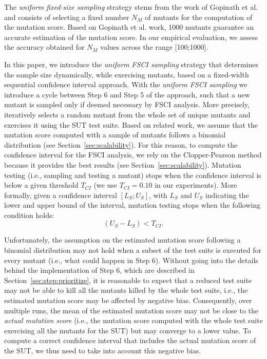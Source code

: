  {The \emph{uniform fixed-size sampling} strategy stems from the work of Gopinath et al.~\cite{gopinath2015hard} and consists of selecting a fixed number $N_M$ of mutants for the computation of the mutation score. Based on Gopinath et al. work, 1000 mutants guarantee an accurate estimation of the mutation score. In our empirical evaluation, we assess the accuracy obtained for $N_M$ values across the range [100;1000].}

 {In this paper, we introduce the \emph{uniform FSCI sampling} strategy that determines the sample size dynamically, while exercising mutants, based on a fixed-width sequential confidence interval approach.
With the \emph{uniform FSCI sampling} we introduce a cycle between Step 6 and Step 5 of the approach, such that a new mutant is sampled only if deemed necessary by FSCI analysis.
 More precisely, \APPR iteratively selects a random mutant from the whole set of unique mutants and exercises it using the SUT test suite. 
Based on related work, we assume that the mutation score computed with a sample of mutants follows a binomial distribution (see Section~\ref{sec:scalability}).
For this reason, to compute the confidence interval for the FSCI analysis, we rely on the Clopper-Pearson method because it provides the best results (see Section~\ref{sec:scalability}).
Mutation testing (i.e., sampling and testing a mutant) stops when the confidence interval is below a given threshold $T_{\mathit{CI}}$ (we use $T_{\mathit{CI}}=0.10$ in our experiments). More formally, given a confidence interval 
$[\mathit{L}_{S};\mathit{U}_{S}]$, with $\mathit{L}_{S}$ and $\mathit{U}_{S}$ indicating the lower and upper bound of the interval, mutation testing stops when the following condition holds:}
\begin{equation}
(\mathit{U}_{S}-\mathit{L}_{S})<T_{\mathit{CI}}.
\end{equation}

 {Unfortunately, the assumption on the estimated mutation score following a binomial distribution may not hold when a subset of the test suite is executed for every mutant (i.e., what could happen in Step 6). Without going into the details behind the implementation of Step 6, which are described in Section~\ref{sec:step:prioritize}, 
it is reasonable to expect that a reduced test suite may not be able to kill all the mutants killed by the whole test suite, i.e., the estimated mutation score may be affected by negative bias. Consequently, over multiple runs, the mean of the estimated mutation score may not be close to the \emph{actual mutation score} (i.e., the mutation score computed with the whole test suite exercising all the mutants for the SUT)
 but may converge to a lower value. 
To compute a correct confidence interval that includes the actual mutation score of the SUT, we thus need to take into account this negative bias.}

